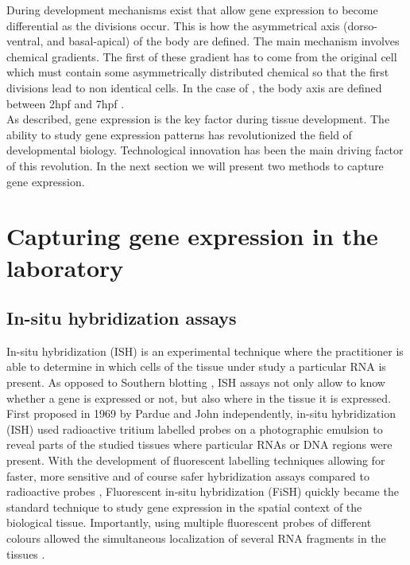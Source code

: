 	During development mechanisms exist that allow gene expression to become differential as the divisions occur. This is how the asymmetrical axis (dorso-ventral, and basal-apical) of the body are defined. The main mechanism involves chemical gradients. The first of these gradient has to come from the original cell which must contain some asymmetrically distributed chemical so that the first divisions lead to non identical cells. In the case of \platyfull{}, the body axis are defined  between 2hpf and 7hpf \cite{Fischer10}.\\
	
	As described, gene expression is the key factor during tissue development. The ability to study gene expression patterns has revolutionized the field of developmental biology. Technological innovation has been the main driving factor of this revolution. In the next section we will present two methods to capture gene expression.


\section{Capturing gene expression in the laboratory}\label{sec:gene_expression_lab}
     \subsection{In-situ hybridization assays}
     In-situ hybridization (ISH) is an experimental technique where the practitioner is able to determine in which cells of the tissue under study a particular RNA is present. As opposed to Southern blotting \cite{southern75}, ISH assays not only allow to know whether a gene is expressed or not, but also where in the tissue it is expressed. First proposed in 1969 by Pardue \cite{pardue69} and John \cite{john69} independently, in-situ hybridization (ISH) used radioactive tritium labelled probes on a photographic emulsion to reveal parts of the studied tissues where particular RNAs or DNA regions were present. With the development of fluorescent labelling techniques \cite{landegent84,pinkel88} allowing for faster, more sensitive and of course safer hybridization assays compared to radioactive probes \cite{swiger96}, Fluorescent in-situ hybridization (FiSH) quickly became the standard technique to study gene expression in the spatial context of the biological tissue. Importantly, using multiple fluorescent probes of different colours allowed the simultaneous localization of several RNA fragments in the tissues \cite{nederlof89}.
     

